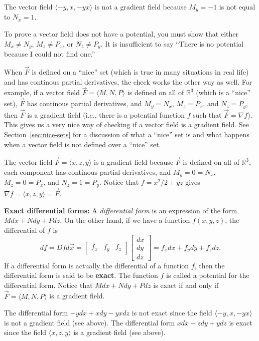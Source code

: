 \begin{example}
The vector field $\langle-y,x,-yx\rangle$ is not a
  gradient field because {$M_y=-1$} is not equal to {$N_x=1$}.
\end{example}
To prove a vector field does not have a potential, you must show that
either $M_x\neq N_y$, $M_z\neq P_x$, or $N_z\neq P_y$. It is insufficient to
say ``There is no potential because I could not find one.''


When $\vec F$ is defined on a ``nice'' set (which is true in many
situations in real life) and has continous partial derivatives, the check
works the other way as well.  For example, if a vector field $\vec
F=\langle M,N,P\rangle$ is defined on all of $\mathbb{R}^3$ (which is a ``nice''
set), $\vec F$ has continous partial derivatives, and $M_y=N_x$,
$M_z=P_x$, and $N_z=P_y$, then $\vec F$ is a gradient field (i.e.,
there is a potential function $f$ such that $\vec F = \nabla f$).  This
gives us a very nice way of checking if a vector field is a gradient
field.  See Section~\ref{sec:nice-sets} for a discussion of what a ``nice'' set is
and what happens when a vector field is not defined over a ``nice''
set.


\begin{example}
The vector field $\vec F=\langle x,z,y\rangle$ is
  a gradient field because $\vec F$ is defined on all of
  $\mathbb{R}^3$, each component has continous partial derivatives,
  and $M_y=0=N_x$, $M_z=0=P_x$, and $N_z=1=P_y$.  Notice that
  $f=x^2/2+yz$ gives $\nabla f = \langle x,z,y\rangle=\vec F$.
\end{example}

\textbf{Exact differential forms:} A \emph{differential form} is an
expression of the form {$Mdx+Ndy+Pdz$}.  On the other hand, if we have
a function $f(x,y,z)$, the differential of $f$ is 
$$df = Df d\vec x
= \begin{bmatrix}f_x&f_y&f_z
\end{bmatrix}\begin{bmatrix}dx\\dy\\dz\end{bmatrix}=f_x dx+f_y dy+f_z
dz.$$ If a differential form is actually the differential of a
function {$f$}, then the differential form is said to be
\textbf{exact}.  The function {$f$} is called a potential for the
differential form.  Notice that {$Mdx+Ndy+Pdz$} is exact if and only
if {$\vec F = \langle M,N,P\rangle$} is a gradient field.

\begin{example}
The differential form $-ydx+xdy-yxdz$ is not
  exact since the field $\langle-y,x,-yx\rangle$ is not a gradient
  field (see above).  The differential form $xdx+zdy+ydz$ is exact
  since the field $\langle x,z,y\rangle$ is a gradient field (see
  above).
\end{example}
